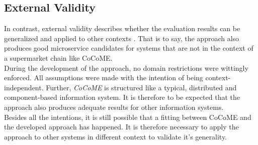 \subsection{External Validity}
In contrast, external validity describes whether the evaluation results can be generalized and applied to other contexts \cite{Validity}. That is to say, the approach also produces good microservice candidates for systems that are not in the context of a supermarket chain like CoCoME. \\
During the development of the approach, no domain restrictions were wittingly enforced. All assumptions were made with the intention of being context-independent. Further, \textit{CoCoME} is structured like a typical, distributed and component-based information system. It is therefore to be expected that the approach also produces adequate results for other information systems. \\
Besides all the intentions, it is still possible that a fitting between CoCoME and the developed approach has happened. It is therefore necessary to apply the approach to other systems in different context to validate it's generality.








